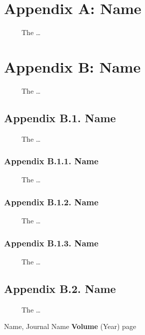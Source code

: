 \documentclass[12pt,letterpaper]{report}
\begin{document}
\section*{Appendix A: Name}
\ \ \ \ \ The \ldots

\section*{Appendix B: Name}
\ \ \ \ \ The \ldots

\subsection*{Appendix B.1. Name}
\ \ \ \ \ The \ldots

\subsubsection*{Appendix B.1.1. Name}
\ \ \ \ \ The \ldots

\subsubsection*{Appendix B.1.2. Name}
\ \ \ \ \ The \ldots

\subsubsection*{Appendix B.1.3. Name}
\ \ \ \ \ The \ldots

\subsection*{Appendix B.2. Name}
\ \ \ \ \ The \ldots


\renewcommand\bibname{References}
\begin{thebibliography}{99}
Name, Journal Name {\bf Volume} (Year) page
\end{thebibliography}
\end{document}
